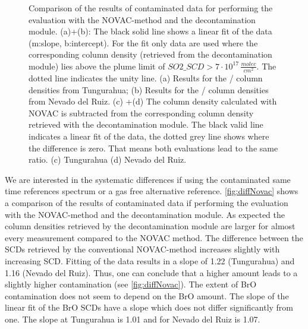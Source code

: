 \documentclass  [
  paper    = a4,
  BCOR     = 10mm,
  twoside,
  fontsize = 12pt,
  fleqn,
  toc      = bibnumbered,
  toc      = listofnumbered,
  numbers  = noendperiod,
  headings = normal,
  listof   = leveldown,
  version  = 3.03
]                                       {scrreprt}
\begin{document}
\begin{figure}[h!]
{		\label{fig:diffratioc}}
	\caption{Comparison of the results of contaminated data for performing the evaluation with the NOVAC-method and the decontamination module.  (a)+(b): The black solid line shows a linear fit of the data (m:slope, b:intercept). For the fit only data are used where the corresponding   column density (retrieved from the decontamination module) lies above the plume limit of $SO2\_SCD>7\cdot 10^{17}\,\frac{molec}{cm^2}$. The dotted line indicates the unity line. (a) Results for the   /  column densities from Tungurahua; (b) Results for the   /  column densities from Nevado del Ruiz. 
		(c) +(d) The column density calculated with NOVAC is subtracted from the corresponding column density retrieved with the decontamination module. The black valid line indicates a linear fit of the data, the dotted grey line shows where the difference is zero. That means both evaluations lead to the same ratio. (c) Tungurahua (d) Nevado del Ruiz. }
	\label{fig:diffratio}
\end{figure}
	We are interested in the systematic differences if using the contaminated same time references spectrum or a gas free alternative reference.  
	\cref{fig:diffNovac} shows a comparison of the results of contaminated data if performing the evaluation with the NOVAC-method and the decontamination module. 
	As expected the   column densities retrieved by the decontamination module are larger for almost every measurement compared to the NOVAC method. The difference between the  SCDs retrieved by the conventional NOVAC-method increases slightly with increasing  SCD. Fitting of the data results in a slope of 1.22 (Tungurahua) and 1.16 (Nevado del Ruiz). Thus, one can conclude that  a higher  amount leads to a slightly higher contamination (see \cref{fig:diffNovac}). The extent of BrO contamination does not seem to depend on the BrO amount. The slope of the linear fit of the BrO SCDs have a slope which does not differ significantly from one. The slope at Tungurahua is 1.01 and for Nevado del Ruiz  is 1.07. \\
\end{document}
